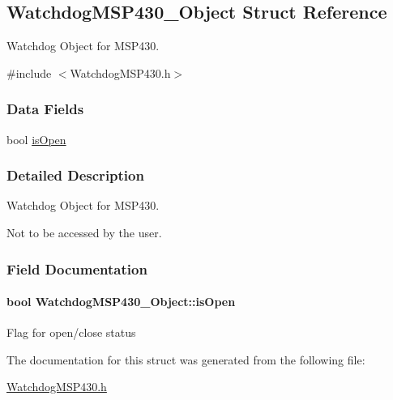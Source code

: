 \subsection{Watchdog\+M\+S\+P430\+\_\+\+Object Struct Reference}
\label{struct_watchdog_m_s_p430___object}


Watchdog Object for M\+S\+P430.  




{\ttfamily \#include $<$Watchdog\+M\+S\+P430.\+h$>$}

\subsubsection*{Data Fields}
\begin{DoxyCompactItemize}
\item 
bool \hyperlink{struct_watchdog_m_s_p430___object_abf8d36f3f4830d5bf9e1a69ed98c4a55}{is\+Open}
\end{DoxyCompactItemize}


\subsubsection{Detailed Description}
Watchdog Object for M\+S\+P430. 

Not to be accessed by the user. 

\subsubsection{Field Documentation}
\paragraph[{is\+Open}]{\setlength{\rightskip}{0pt plus 5cm}bool Watchdog\+M\+S\+P430\+\_\+\+Object\+::is\+Open}\label{struct_watchdog_m_s_p430___object_abf8d36f3f4830d5bf9e1a69ed98c4a55}
Flag for open/close status 

The documentation for this struct was generated from the following file\+:\begin{DoxyCompactItemize}
\item 
\hyperlink{_watchdog_m_s_p430_8h}{Watchdog\+M\+S\+P430.\+h}\end{DoxyCompactItemize}
